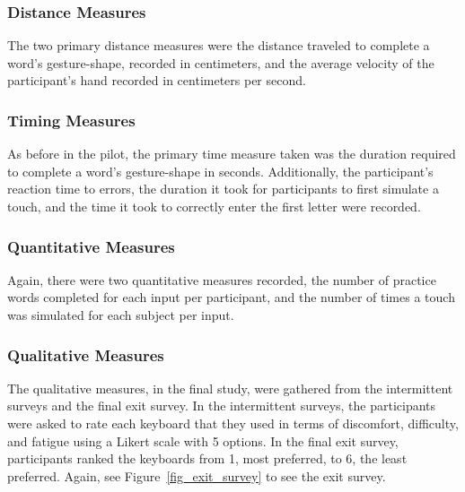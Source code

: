 \subsubsection{Distance Measures}
The two primary distance measures were the distance traveled to complete a word's gesture-shape, recorded in centimeters, and the average velocity of the participant's hand recorded in centimeters per second.

\subsubsection{Timing Measures}
As before in the pilot, the primary time measure taken was the duration required to complete a word's gesture-shape in seconds. Additionally, the participant's reaction time to errors, the duration it took for participants to first simulate a touch, and the time it took to correctly enter the first letter were recorded.

\subsubsection{Quantitative Measures}
Again, there were two quantitative measures recorded, the number of practice words completed for each input per participant, and the number of times a touch was simulated for each subject per input.

\subsubsection{Qualitative Measures}
The qualitative measures, in the final study, were gathered from the intermittent surveys and the final exit survey. In the intermittent surveys, the participants were asked to rate each keyboard that they used in terms of discomfort, difficulty, and fatigue using a Likert scale with 5 options. In the final exit survey, participants ranked the keyboards from 1, most preferred, to 6, the least preferred. Again, see Figure~\ref{fig_exit_survey} to see the exit survey. 